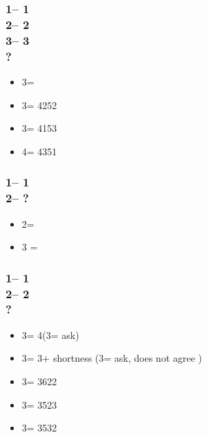 \documentclass[12pt, a4paper]{report}
\begin{document}
{{{            \subsubsection*{1\diams -- 1\spades\\
                            2\spades -- 2\nt\\
                            3\clubs -- 3\diams\\
                            ?}
            \begin{itemize}
                \item 3\hearts = \bal
                \item 3\spades = 4252
                \item 3\nt = 4153
                \item 4\clubs = 4351
            \end{itemize}

            \subsubsection*{1\hearts -- 1\spades\\
                            2\spades -- ?}
            \begin{itemize}
                \item 2\nt = \gf
                \item 3 = \inv
            \end{itemize}

            \subsubsection*{1\hearts -- 1\spades\\
                            2\spades -- 2\nt\\
                            ?}
            \begin{itemize}
                \item 3\clubs = 4\spades (3\diams = ask)
                \item 3\diams = 3\spades + shortness (3\hearts = ask, does not agree \spades)
                \item 3\hearts = 3622
                \item 3\spades = 3523
                \item 3\nt = 3532
            \end{itemize}

}}}
\end{document}
